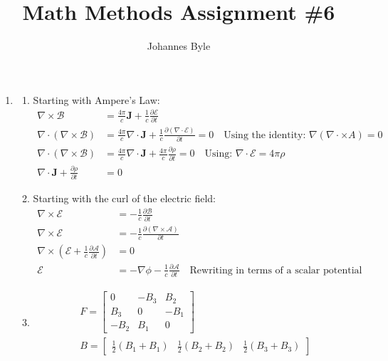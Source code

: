 \documentclass[12pt]{article}
\title{Math Methods Assignment \#6}
\author{Johannes Byle}
\newcommand{\p}[2]{\frac{\partial #1}{\partial #2}}
\newcommand{\curl}{\nabla\times}
\newcommand{\divr}{\nabla\cdot}
\begin{document}
    \maketitle
    \begin{enumerate}
        \item
        \begin{enumerate}
            \item Starting with Ampere's Law:
            \begin{align*}
                \curl\mathcal{B}&=\frac{4\pi}{c}\pmb{J}+\frac{1}{c}\p{\mathcal{E}}{t}\\
                \divr\left(\nabla\times\mathcal{B}\right)&=\frac{4\pi}{c}\divr\pmb{J}+\frac{1}{c}\p{(\nabla\cdot\mathcal{E})}{t}=0\quad\text{Using the identity: }\nabla\left( \nabla\cdot\times A \right)=0\\
                \divr\left(\nabla\times\mathcal{B}\right)&=\frac{4\pi}{c}\divr\pmb{J}+\frac{4\pi}{c}\p{\rho}{t}=0\quad\text{Using: }\nabla\cdot\mathcal{E}=4\pi\rho\\
                \divr\pmb{J}+\p{\rho}{t}&=0
            \end{align*}
            \item Starting with the curl of the electric field:
            \begin{align*}
                \curl\mathcal{E}&=-\frac{1}{c}\p{\mathcal{B}}{t}\\
                \curl\mathcal{E}&=-\frac{1}{c}\p{(\curl\mathcal{A})}{t}\\
                \curl\left(\mathcal{E}+\frac{1}{c}\p{\mathcal{A}}{t}\right)&=0\\
                \mathcal{E}&=-\nabla\phi-\frac{1}{c}\p{\mathcal{A}}{t}\quad\text{Rewriting in terms of a scalar potential}
            \end{align*}
            \item
            \begin{gather*}
                F=
                \begin{bmatrix}
                    0    & -B_3 & B_2  \\
                    B_3  & 0    & -B_1 \\
                    -B_2 & B_1  & 0
                \end{bmatrix}\\
                B=
                \begin{bmatrix}
                    \frac{1}{2}(B_1+B_1) & \frac{1}{2}(B_2+B_2)& \frac{1}{2}(B_3+B_3)

\end{bmatrix}
\end{gather*}
\end{enumerate}
\end{enumerate}
\end{document}
